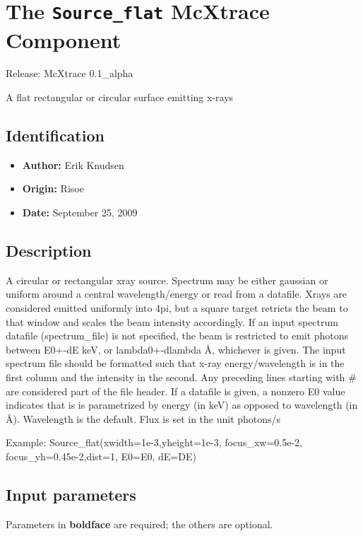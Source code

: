 \section{The \texttt{Source\_flat} McXtrace Component}
Release: McXtrace 0.1\_alpha

A flat rectangular or circular surface emitting x-rays

\subsection*{Identification}
\begin{itemize}
  \item \textbf{Author:} Erik Knudsen
  \item \textbf{Origin:} Risoe
  \item \textbf{Date:} September 25, 2009
\end{itemize}

\subsection*{Description}
A circular or rectangular xray source. Spectrum may be either gaussian or uniform around a central wavelength/energy or read from a datafile. Xrays are considered emitted uniformly into 4pi, but a square target retricts the beam to that window and scales the beam intensity accordingly. If an input spectrum datafile (spectrum\_file) is not specified, the beam is restricted to emit photons between E0+-dE keV, or lambda0+-dlambda \AA{}, whichever is given. The input spectrum file should be formatted such that x-ray energy/wavelength is in the first column and the intensity in the second. Any preceding lines starting with \# are considered part of the file header. If a datafile is given, a nonzero E0 value indicates that is is parametrized by energy (in keV) as opposed to wavelength (in \AA{}). Wavelength is the default. Flux is set in the unit photons/s

Example: Source\_flat(xwidth=1e-3,yheight=1e-3, focus\_xw=0.5e-2, focus\_yh=0.45e-2,dist=1, E0=E0, dE=DE)

\subsection*{Input parameters}
Parameters in \textbf{boldface} are required; the others are optional.


